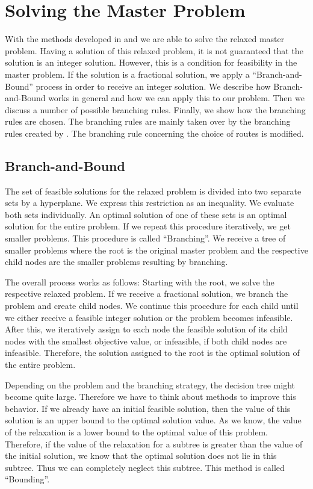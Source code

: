 \section{Solving the Master Problem}
\label{sec:solving_masterproblem}

With the methods developed in  and  we are able to solve the relaxed master problem. Having a solution of this relaxed problem, it is not guaranteed that the solution is an integer solution. However, this is a condition for feasibility in the master problem. If the solution is a fractional solution, we apply a \enquote{Branch-and-Bound} process in order to receive an integer solution. We describe how Branch-and-Bound works in general and how we can apply this to our problem. Then we discuss a number of possible branching rules. Finally, we show how the branching rules are chosen. The branching rules are mainly taken over by the branching rules created by \cite{Kaiser}. The branching rule concerning the choice of routes is modified.

\subsection{Branch-and-Bound}

The set of feasible solutions for the relaxed problem is divided into two separate sets by a hyperplane. We express this restriction as an inequality. We evaluate both sets individually. An optimal solution of one of these sets is an optimal solution for the entire problem. If we repeat this procedure iteratively, we get smaller problems. This procedure is called \enquote{Branching}. We receive a tree of smaller problems where the root is the original master problem and the respective child nodes are the smaller problems resulting by branching.

The overall process works as follows: Starting with the root, we solve the respective relaxed problem. If we receive a fractional solution, we branch the problem and create child nodes. We continue this procedure for each child until we either receive a feasible integer solution or the problem becomes infeasible. After this, we iteratively assign to each node the feasible solution of its child nodes with the smallest objective value, or infeasible, if both child nodes are infeasible. Therefore, the solution assigned to the root is the optimal solution of the entire problem.

Depending on the problem and the branching strategy, the decision tree might become quite large. Therefore we have to think about methods to improve this behavior. If we already have an initial feasible solution, then the value of this solution is an upper bound to the optimal solution value. As we know, the value of the relaxation is a lower bound to the optimal value of this problem. Therefore, if the value of the relaxation for a subtree is greater than the value of the initial solution, we know that the optimal solution does not lie in this subtree. Thus we can completely neglect this subtree. This method is called \enquote{Bounding}.

